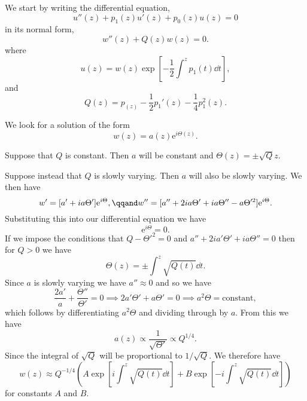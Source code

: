 \documentclass[fleqn]{NotesClass}
\newcommand*{\e}{\mathrm{e}}
\begin{document}
    We start by writing the differential equation,
    \begin{equation}
        u''(z) + p_1(z)u'(z) + p_0(z)u(z) = 0
    \end{equation}
    in its normal form,
    \begin{equation}
        w''(z) + Q(z)w(z) = 0.
    \end{equation}
    where
    \begin{equation}
        u(z) = w(z)\exp\left[ -\frac{1}{2}\int^z p_1(t) \dd{t} \right],
    \end{equation}
    and
    \begin{equation}
        Q(z) = p_(z) - \frac{1}{2}p_1'(z) - \frac{1}{4}p_1^2(z).
    \end{equation}
    
    We look for a solution of the form
    \begin{equation}
        w(z) = a(z) \e^{i\Theta(z)}.
    \end{equation}
    
    Suppose that \(Q\) is constant.
    Then \(a\) will be constant and \(\Theta(z) = \pm \sqrt{Q}z\).
    
    Suppose instead that \(Q\) is slowly varying.
    Then \(a\) will also be slowly varying.
    We then have
    \begin{equation}
        w' = [a' + ia\Theta']\e^{i\Theta}, \qqand w'' = [a'' + 2ia\Theta' + ia\Theta'' - a\Theta'^2]\e^{i\Theta}.
    \end{equation}
    Substituting this into our differential equation we have
    \begin{equation}
        [a'' + 2ia'\Theta' + ia\Theta'' + (Q - \Theta'^2)]\e^{i\Theta} = 0.
    \end{equation}
    If we impose the conditions that \(Q - \Theta'^2 = 0\) and \(a'' + 2ia'\Theta' + ia\Theta'' = 0\) then for \(Q > 0\) we have
    \begin{equation}
        \Theta(z) = \pm \int^z \sqrt{Q(t)}\dd{t}.
    \end{equation}
    Since \(a\) is slowly varying we have \(a'' \approx 0\) and so we have
    \begin{equation}
        \frac{2a'}{a} + \frac{\Theta''}{\Theta'} = 0 \implies 2a'\Theta' + a\Theta' = 0 \implies a^2\Theta = \text{constant},
    \end{equation}
    which follows by differentiating \(a^2\Theta\) and dividing through by \(a\).
    From this we have
    \begin{equation}
        a(z) \propto \frac{1}{\sqrt{\Theta'}} \propto Q^{1/4}.
    \end{equation}
    Since the integral of \(\sqrt{Q}\) will be proportional to \(1/\sqrt{Q}\).
    We therefore have
    \begin{equation}
        w(z) \approx Q^{-1/4} \left( A \exp\left[ i\int^z \sqrt{Q(t)} \dd{t} \right] + B \exp\left[ -i\int^z \sqrt{Q(t)} \dd{t} \right] \right)
    \end{equation}
    for constants \(A\) and \(B\).
    
\end{document}
